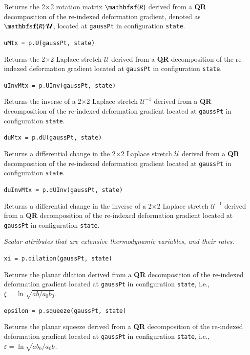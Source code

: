 \medskip\noindent
Returns the 2$\times$2 rotation matrix $\mathbfsf{R}$ derived from a \textbf{QR} decomposition of the re-indexed deformation gradient, denoted as $\mathbfsf{R}\hspace{1pt}\boldsymbol{\mathcal{U}}$, located at \texttt{gaussPt} in configuration \texttt{state}.

\medskip\noindent
\texttt{uMtx = p.U(gaussPt, state)}

\medskip\noindent
Returns the 2$\times$2 Laplace stretch $\boldsymbol{\mathcal{U}}$ derived from a \textbf{QR} decomposition of the re-indexed deformation gradient located at \texttt{gaussPt} in configuration \texttt{state}.

\medskip\noindent
\texttt{uInvMtx = p.UInv(gaussPt, state)}

\medskip\noindent
Returns the inverse of a 2$\times$2 Laplace stretch $\boldsymbol{\mathcal{U}}^{-1}$ derived from a \textbf{QR} decomposition of the re-indexed deformation gradient located at \texttt{gaussPt} in configuration \texttt{state}.

\medskip\noindent
\texttt{duMtx = p.dU(gaussPt, state)}

\medskip\noindent
Returns a differential change in the 2$\times$2 Laplace stretch $\boldsymbol{\mathcal{U}}$ derived from a \textbf{QR} decomposition of the re-indexed deformation gradient located at \texttt{gaussPt} in configuration \texttt{state}.

\medskip\noindent
\texttt{duInvMtx = p.dUInv(gaussPt, state)}

\medskip\noindent
Returns a differential change in the inverse of a 2$\times$2 Laplace stretch $\boldsymbol{\mathcal{U}}^{-1}$ derived from a \textbf{QR} decomposition of the re-indexed deformation gradient located at \texttt{gaussPt} in configuration \texttt{state}.

\medskip\noindent
\textit{Scalar attributes that are extensive thermodynamic variables, and their rates.}

\medskip\noindent
\texttt{xi = p.dilation(gaussPt, state)}

\medskip\noindent
Returns the planar dilation derived from a \textbf{QR} decomposition of the re-indexed deformation gradient located at \texttt{gaussPt} in configuration \texttt{state}, i.e., $\xi = \ln \sqrt{ab/a_0b_0}$.

\medskip\noindent
\texttt{epsilon = p.squeeze(gaussPt, state)}

\medskip\noindent
Returns the planar squeeze derived from a \textbf{QR} decomposition of the re-indexed deformation gradient located at \texttt{gaussPt} in configuration \texttt{state}, i.e., $\varepsilon = \ln \sqrt{ab_0/a_0b}$.


